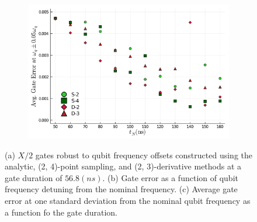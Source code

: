 \documentclass[
  amsfonts,
  amsmath,
  tbtags,
  amssymb,
  aps,
  nobibnotes,
  twocolumn,
]{revtex4-2}
\begin{document}
\begin{figure}[ht]
  \begin{subfigure}{\linewidth}
    \includegraphics[width=\linewidth]{assets/f2c.png}
    \label{fig:5.1:c}
  \end{subfigure}
  
  \caption{\centering (a) $X/2$ gates robust to qubit frequency offsets
    constructed using the analytic, (2, 4)-point
    sampling, and (2, 3)-derivative methods at a gate duration of $56.8 (ns)$.
    (b) Gate error as a function of qubit frequency detuning from the nominal frequency.
    (c) Average gate error at one standard deviation from the nominal qubit frequency as
    a function fo the gate duration.
  }
\end{figure}
\end{document}
